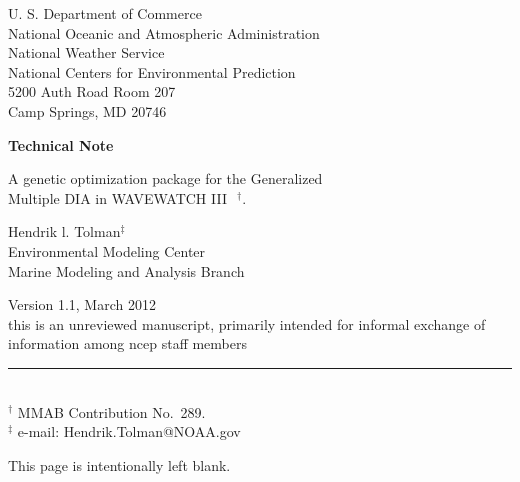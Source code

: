 \documentclass[12pt]{article}
\newcommand{\pstyle}{plain}
\newcommand{\wwt}{WAVEWATCH III$\:$\textsuperscript\textregistered}
\newcommand{\bpage}{\vfill \pagebreak \strut

\vspace{2.5in} \centerline{This page is intentionally left blank.}}
\begin{document}

\pagestyle{empty}

\strut \vspace{5mm}

\begin{center} 
U. S. Department of Commerce \\
National Oceanic and Atmospheric Administration \\
National Weather Service \\
National Centers for Environmental Prediction \\
5200 Auth Road Room 207 \\
Camp Springs, MD 20746

\vspace{15mm}

{\bf Technical Note}

\vspace{15mm}

{\large A genetic optimization package for the Generalized \\ Multiple DIA in
  \wwt\ $^\dag$.}

\vspace{20mm}

Hendrik l. Tolman$^\ddag$
\\
Environmental Modeling Center \\
Marine Modeling and Analysis Branch

\vspace{20mm}

Version 1.1, March 2012 \\

\vfill {\sc this is an unreviewed manuscript, primarily
intended for informal exchange of information among ncep staff
members}

\end{center}
\noindent \rule{140mm}{0.5mm} \\
{\small $^\dag$ MMAB Contribution No.~289. \\
$^\ddag$ e-mail: Hendrik.Tolman@NOAA.gov} \\

\bpage

\pagebreak

\pagestyle{\pstyle}
\setcounter{page}{1}
\end{document}
